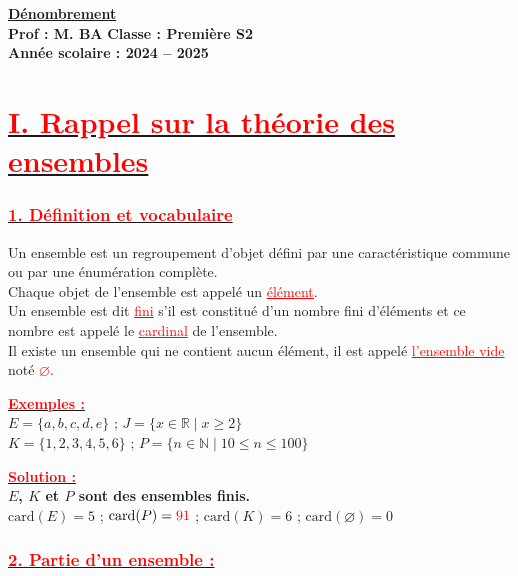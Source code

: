 \documentclass[a4paper,12pt]{article}
\begin{document}
\small

\begin{center}
    \Large\textbf{\underline{Dénombrement}}\\[-0.1cm]
    \normalsize\textbf{Prof : M. BA} \hfill \textbf{Classe : Première S2}\\[-0.1cm]
    \textbf{Année scolaire : 2024 -- 2025}
\end{center}

\section*{\underline{\textcolor{red}{I. Rappel sur la théorie des ensembles}}}

\subsubsection*{\underline{\textcolor{red}{1. Définition et vocabulaire}}}

Un ensemble est un regroupement d’objet défini par une caractéristique commune ou par une énumération complète.\\
Chaque objet de l’ensemble est appelé un \textcolor{red}{\underline{élément}}.\\
Un ensemble est dit \textcolor{red}{\underline{fini}} s’il est constitué d’un nombre fini d’éléments et ce nombre est appelé le \textcolor{red}{\underline{cardinal}} de l’ensemble.\\
Il existe un ensemble qui ne contient aucun élément, il est appelé \textcolor{red}{\underline{l’ensemble vide}} noté \textcolor{red}{\( \varnothing \)}.

\textbf{\underline{\textcolor{red}{Exemples :}}}\\
$E = \{ a, b, c, d, e \}$ \quad ; \quad $J = \{ x \in \mathbb{R} \mid x \geq 2 \}$\\
$K = \{ 1, 2, 3, 4, 5, 6 \}$ \quad ; \quad $P = \{ n \in \mathbb{N} \mid 10 \leq n \leq 100 \}$

\textbf{\underline{\textcolor{red}{Solution :}}}\\
\textbf{$E$, $K$ et $P$ sont des ensembles finis.}\\
$\text{card}(E) = 5$ \quad ; \quad $\text{card}(P) = \textcolor{red}{91}$ \quad ; \quad $\text{card}(K) = 6$ \quad ; \quad $\text{card}(\varnothing) = 0$

\subsubsection*{\underline{\textcolor{red}{2. Partie d’un ensemble :}}}
\end{document}
